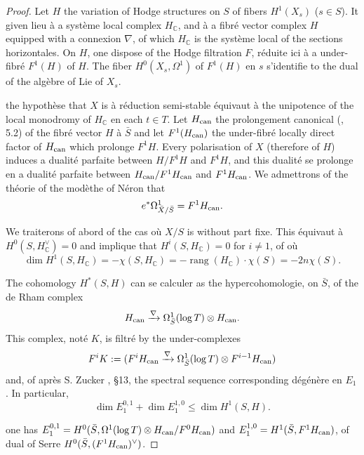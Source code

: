 \documentclass[12pt,a4paper]{article}
\theoremstyle{plain}
\theoremstyle{definition}
\DeclareMathOperator{\rank}{rang}
\newcommand{\can}{\textup{can}}
\newcommand{\CC}{\mathbb{C}}
\begin{document}
{\begin{proof}
Let $H$ the variation of Hodge structures on $S$ of fibers $H^{1}(X_{s})$ ($s \in S$). It given lieu \`{a} a syst\`{e}me local complex $H_{\CC}$, and \`{a} a fibr\'{e} vector complex $H$ equipped with a connexion $\nabla$, of which $H_{\CC}$ is the syst\`{e}me local of the sections horizontales. On $H$, one dispose of the Hodge filtration $F$, r\'{e}duite ici \`{a} a under-fibr\'{e} $F^{1}(H)$ of $H$. The fiber $H^{0}(X_{s}, \Omega^{1})$ of $F^{1}(H)$ en $s$ s'identifie to the dual of the alg\`{e}bre of Lie of $X_{s}$.

the hypoth\`{e}se that $X$ is \`{a} r\'{e}duction semi-stable \'{e}quivaut \`{a} the unipotence of the local monodromy of $H_{\CC}$ en each $t \in T$. Let $H_{\can}$ the prolongement canonical (\cite{DeligneEDR}, 5.2) of the fibr\'{e} vector $H$ \`{a} $\bar{S}$ and let $F^{1}(H_{\can})$ the under-fibr\'{e} locally direct factor of $H_{\can}$ which prolonge $F^{1}H$. Every polarisation of $X$ (therefore of $H$) induces a dualit\'{e} parfaite between $H/F^{1}H$ and $F^{1}H$, and this dualit\'{e} se prolonge en a dualit\'{e} parfaite between $H_{\can}/F^{1}H_{\can}$ and $F^{1}H_{\can}$. We admettrons of the th\'{e}orie of the mod\`{e}the of N\'{e}ron that
\[
e^{*}\Omega^{1}_{\bar{X}/\bar{S}} = F^{1}H_{\can}.
\]

We traiterons of abord of the cas o\`{u} $X/S$ is without part fixe. This \'{e}quivaut \`{a} $H^{0}(S, H_{\CC}^{\vee}) = 0$ and implique that $H^{i}(S, H_{\CC}) = 0$ for $i \neq 1$, of o\`{u}
\begin{equation}\label{eq:3.2.1}
\dim H^{1}(S, H_{\CC}) = -\chi(S, H_{\CC}) = -\rank(H_{\CC}) \cdot \chi(S) = -2n\chi(S).
\end{equation}

The cohomology $H^{*}(S, H)$ can se calculer as the hypercohomologie, on $\bar{S}$, of the de Rham complex
\[
H_{\can} \xrightarrow{\nabla} \Omega^{1}_{\bar{S}}(\log T) \otimes H_{\can}.
\]
This complex, not\'{e} $K$, is filtr\'{e} by the under-complexes
\[
F^{i}K := (F^{i}H_{\can} \xrightarrow{\nabla} \Omega^{1}_{\bar{S}}(\log T) \otimes F^{i-1}H_{\can})
\]
and, of apr\`{e}s S. Zucker \cite{Zucker}, \S13, the spectral sequence corresponding d\'{e}g\'{e}n\`{e}re en $E_{1}$. In particular,
\begin{equation}\label{eq:3.2.2}
\dim E_{1}^{0,1} + \dim E_{1}^{1,0} \leq \dim H^{1}(S, H).
\end{equation}

one has $E_{1}^{0,1} = H^{0}(\bar{S}, \Omega^{1}(\log T) \otimes H_{\can}/F^{0}H_{\can})$ and $E_{1}^{1,0} = H^{1}(\bar{S}, F^{1}H_{\can})$, of dual of Serre $H^{0}(\bar{S}, (F^{1}H_{\can})^{\vee})$.


\end{proof}}
\end{document}
